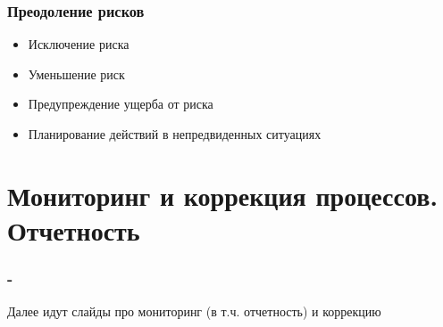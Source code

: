 \documentclass{../industrial-development}
\begin{document}
    \begin{frame} \frametitle{Преодоление рисков}
        \begin{itemize}
         \item Исключение риска
         \item Уменьшение риск 
         \item Предупреждение ущерба от риска
         \item Планирование действий в непредвиденных ситуациях
        \end{itemize}
    \end{frame}

    \section{Мониторинг и коррекция процессов. Отчетность}

    \begin{frame} \frametitle{-}
        Далее идут слайды про мониторинг (в т.ч. отчетность) и коррекцию
    \end{frame}
    
    
\end{document}

